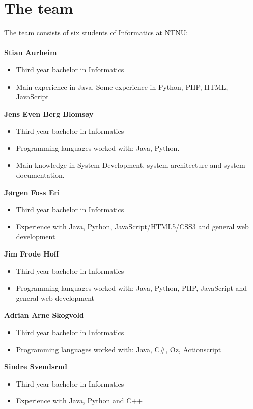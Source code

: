 \section{The team}
The team consists of six students of Informatics at NTNU:\\
\\
\textbf{Stian Aurheim}
\begin{itemize} \setlength{\itemsep}{0cm}\setlength{\parskip}{0cm}
	\item Third year bachelor in Informatics
	\item Main experience in Java. Some experience in Python, PHP, HTML, 
		  JavaScript 
\end{itemize}
\textbf{Jens Even Berg Blomsøy}
\begin{itemize} \setlength{\itemsep}{0cm}\setlength{\parskip}{0cm}
	\item Third year bachelor in Informatics
	\item Programming languages worked with: Java, Python.
	\item Main knowledge in System Development, system architecture and 
		  system documentation.
\end{itemize}
\textbf{Jørgen Foss Eri}
\begin{itemize} \setlength{\itemsep}{0cm}\setlength{\parskip}{0cm}
	\item Third year bachelor in Informatics
	\item Experience with Java, Python, JavaScript/HTML5/CSS3 and general web development
\end{itemize}
\textbf{Jim Frode Hoff}
\begin{itemize} \setlength{\itemsep}{0cm}\setlength{\parskip}{0cm}
	\item Third year bachelor in Informatics
	\item Programming languages worked with: Java, Python, PHP, JavaScript
		  and general web development
\end{itemize}
\textbf{Adrian Arne Skogvold}
\begin{itemize} \setlength{\itemsep}{0cm}\setlength{\parskip}{0cm}
	\item Third year bachelor in Informatics
	\item Programming languages worked with: Java, C\#, Oz, Actionscript
\end{itemize}
\textbf{Sindre Svendsrud}
\begin{itemize} \setlength{\itemsep}{0cm}\setlength{\parskip}{0cm}
	\item Third year bachelor in Informatics 
	\item Experience with Java, Python and C++
\end{itemize}

